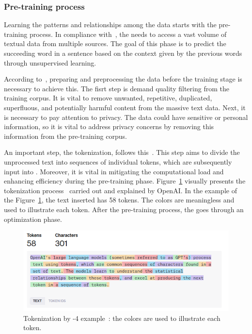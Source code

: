 \subsubsection{Pre-training process}

Learning the patterns and relationships among the data starts with the pre-training process. In compliance with~\citet{min_recent_pretrained}, the {\llm} needs to access a vast volume of textual data from multiple sources. The goal of this phase is to predict the succeeding word in a sentence based on the context given by the previous words through unsupervised learning. 

According to~\citet{hadi_LLM_2023}, preparing and preprocessing the data before the training stage is necessary to achieve this. The fisrt step is demand quality filtering from the training corpus. It is vital to remove unwanted, repetitive, duplicated, superfluous, and potentially harmful content from the massive text data. Next, it is necessary to pay attention to privacy. The data could have sensitive or personal information, so it is vital to address privacy concerns by removing this information from the pre-training corpus.

An important step, the tokenization, follows this~\cite{hadi_LLM_2023}. This step aims to divide the unprocessed text into sequences of individual tokens, which are subsequently input into {\llm}. Moreover, it is vital in mitigating the computational load and enhancing efficiency during the pre-training phase. Figure~\ref{fig_tokenization} visually presents the tokenization process~\cite{noauthor_openai_nodate} carried out and explained by OpenAI. In the example of the Figure~\ref{fig_tokenization}, the text inserted has 58 tokens. The colors are meaningless and used to illustrate each token. After the pre-training process, the {\llm} goes through an optimization phase.

\begin{figure}[ht]
    \includegraphics[width=\textwidth]{figs/chapter2/tokenization.png}
    \centering
    \caption[Tokenization example]{Tokenization by {\gpt}-4 example~\cite{noauthor_openai_nodate}: the colors are used to illustrate each token.}
    \label{fig_tokenization}
\end{figure}



